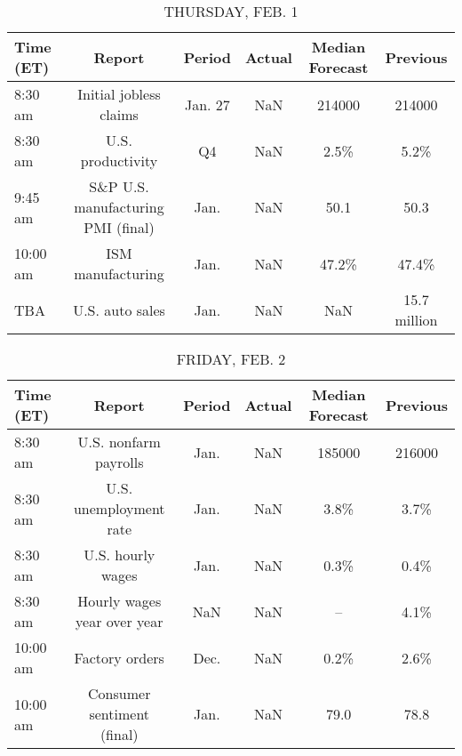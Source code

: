 \documentclass{article}%
\begin{document}
%


\begin{table}[htbp]%
\caption{THURSDAY, FEB. 1}%
\centering%
\begin{adjustbox}{width=1\textwidth}%
\begin{tabular}{lccccc}
\toprule
Time (ET) &                             Report &  Period & Actual & Median Forecast &     Previous \\
\midrule
  8:30 am &             Initial jobless claims & Jan. 27 &    NaN &          214000 &       214000 \\
  8:30 am &                  U.S. productivity &      Q4 &    NaN &            2.5\% &         5.2\% \\
  9:45 am & S\&P U.S. manufacturing PMI (final) &    Jan. &    NaN &            50.1 &         50.3 \\
 10:00 am &                  ISM manufacturing &    Jan. &    NaN &           47.2\% &        47.4\% \\
      TBA &                    U.S. auto sales &    Jan. &    NaN &             NaN & 15.7 million \\
\bottomrule
\end{tabular}
%
\end{adjustbox}%
\end{table}

%


\begin{table}[htbp]%
\caption{FRIDAY, FEB. 2}%
\centering%
\begin{adjustbox}{width=1\textwidth}%
\begin{tabular}{lccccc}
\toprule
Time (ET) &                      Report & Period & Actual & Median Forecast & Previous \\
\midrule
  8:30 am &       U.S. nonfarm payrolls &   Jan. &    NaN &          185000 &   216000 \\
  8:30 am &      U.S. unemployment rate &   Jan. &    NaN &            3.8\% &     3.7\% \\
  8:30 am &           U.S. hourly wages &   Jan. &    NaN &            0.3\% &     0.4\% \\
  8:30 am & Hourly wages year over year &    NaN &    NaN &              -- &     4.1\% \\
 10:00 am &              Factory orders &   Dec. &    NaN &            0.2\% &     2.6\% \\
 10:00 am &  Consumer sentiment (final) &   Jan. &    NaN &            79.0 &     78.8 \\
\bottomrule
\end{tabular}
%
\end{adjustbox}%
\end{table}
\end{document}
